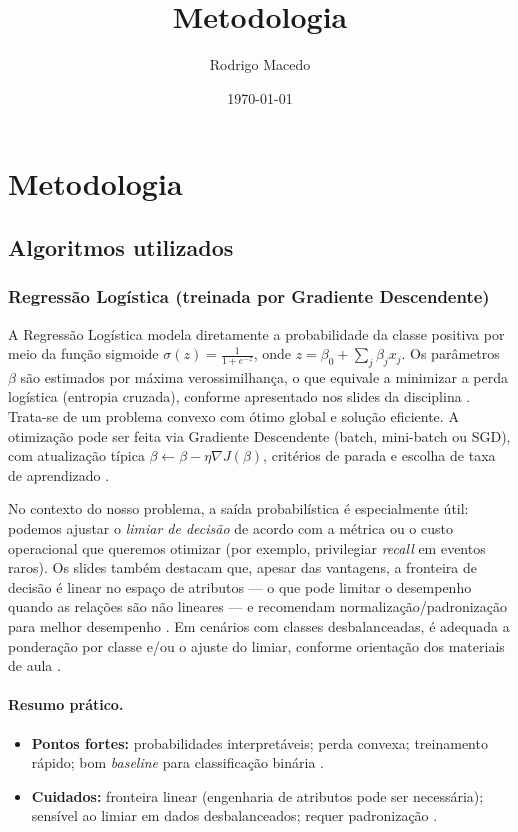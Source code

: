 \documentclass[12pt,oneside]{abntex2}
\title{Metodologia}
\author{Rodrigo Macedo}
\date{\today}
\begin{document}
\maketitle

\section*{Metodologia}

\subsection*{Algoritmos utilizados}

\subsubsection*{Regressão Logística (treinada por Gradiente Descendente)}
A Regressão Logística modela diretamente a probabilidade da classe positiva por meio da função sigmoide
$\sigma(z) = \frac{1}{1 + e^{-z}}$, onde $z = \beta_0 + \sum_j \beta_j x_j$.
Os parâmetros $\beta$ são estimados por máxima verossimilhança, o que equivale a minimizar a perda logística
(entropia cruzada), conforme apresentado nos slides da disciplina \cite{naozuka_logistica_2025}.
Trata-se de um problema convexo com ótimo global e solução eficiente.
A otimização pode ser feita via Gradiente Descendente (batch, mini-batch ou SGD), com atualização típica
$\beta \leftarrow \beta - \eta \nabla J(\beta)$, critérios de parada e escolha de taxa de aprendizado
\cite{naozuka_logistica_2025}.

No contexto do nosso problema, a saída probabilística é especialmente útil: podemos ajustar o \emph{limiar de decisão}
de acordo com a métrica ou o custo operacional que queremos otimizar (por exemplo, privilegiar \emph{recall} em eventos raros).
Os slides também destacam que, apesar das vantagens, a fronteira de decisão é linear no espaço de atributos --- o que pode limitar
o desempenho quando as relações são não lineares --- e recomendam normalização/padronização para melhor desempenho
\cite{naozuka_logistica_2025}. Em cenários com classes desbalanceadas, é adequada a ponderação por classe e/ou o ajuste do limiar,
conforme orientação dos materiais de aula \cite{naozuka_logistica_2025,naozuka_metricas_2025}.

\paragraph*{Resumo prático.}
\begin{itemize}
  \item \textbf{Pontos fortes:} probabilidades interpretáveis; perda convexa; treinamento rápido; bom \emph{baseline} para classificação binária \cite{naozuka_logistica_2025}.
  \item \textbf{Cuidados:} fronteira linear (engenharia de atributos pode ser necessária); sensível ao limiar em dados desbalanceados; requer padronização \cite{naozuka_logistica_2025,naozuka_metricas_2025}.
\end{itemize}
\end{document}
